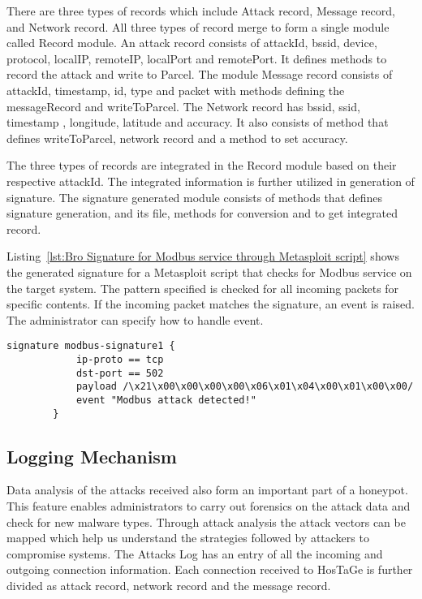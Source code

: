 \documentclass[article,msc=informatik,type=msc,colorback,accentcolor=tud9c]{tudthesis}
\begin{document}
		
		\vspace{3mm}
		There are three types of records which include Attack record, Message record, and Network record. All three types of record merge to form a single module called Record module. An attack record consists of attackId, bssid, device, protocol, local\ac{IP}, remote\ac{IP}, localPort and remotePort. It defines methods to record the attack and write to Parcel. The module Message record consists of attackId, timestamp, id, type and packet with methods defining the messageRecord and writeToParcel. The Network record has bssid, ssid, timestamp , longitude, latitude and accuracy. It also consists of method that defines writeToParcel, network record and a method to set accuracy.
	
	
		\vspace{3mm}
		The three types of records are integrated in the Record module based on their respective attackId. The integrated information is further utilized in generation of signature. The signature generated module consists of methods that defines signature generation, and its file, methods for conversion and to get integrated record.  
	
	
		\vspace{3mm}
		Listing~\ref{lst:Bro Signature for Modbus service through Metasploit script} shows the generated signature for a Metasploit script that  checks for Modbus service on the target system. The pattern specified is checked for all incoming packets for specific contents. If the incoming packet matches the signature, an event is raised. The administrator can specify how to handle event. 
	
	
		\vspace{3mm}
		\begin{lstlisting}[caption=Bro Signature for Modbus service through Metasploit script,label=lst:Bro Signature for Modbus service through Metasploit script ]
		signature modbus-signature1 {
		    ip-proto == tcp
		    dst-port == 502
		    payload /\x21\x00\x00\x00\x00\x06\x01\x04\x00\x01\x00\x00/
		    event "Modbus attack detected!"
		}
		\end{lstlisting}
		
				

	\vspace{5mm} 
	\subsection{Logging Mechanism}\label{Logging Mechanism}
	
		
		Data analysis of the attacks received also form an important part of a honeypot. This feature enables administrators to carry out forensics on the attack data and check for new malware types. Through attack analysis the attack vectors can be mapped which help us understand the strategies followed by attackers to compromise systems. 
		The Attacks Log has an entry of all the incoming and outgoing connection information. Each connection received to HosTaGe is further divided as attack record, network record and the message record. 
	
\end{document}
